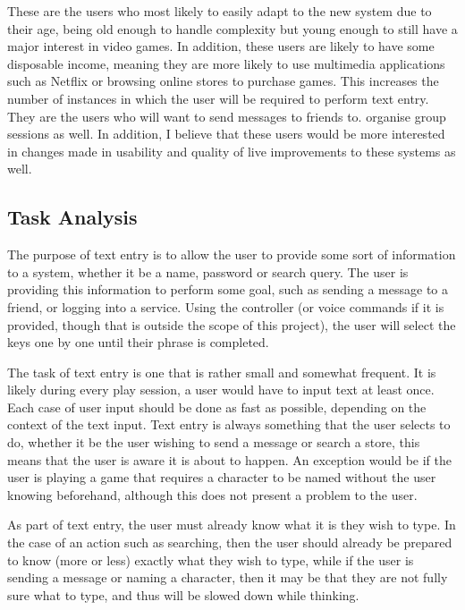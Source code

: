 \documentclass[requirements.tex]{subfiles}
\begin{document}
These are the users who most likely to easily adapt to the new system due to
their age, being old enough to handle complexity but young enough to still have
a major interest in video games. In addition, these users are likely to have
some disposable income, meaning they are more likely to use multimedia
applications such as Netflix or browsing online stores to purchase games. This
increases the number of instances in which the user will be required to perform
text entry. They are the users who will want to send messages to friends to.
organise group sessions as well. In addition, I believe that these users would
be more interested in changes made in usability and quality of live improvements
to these systems as well.

\subsection{Task Analysis} %
\label{sub:task_analysis}
The purpose of text entry is to allow the user to provide some sort of
information to a system, whether it be a name, password or search query. The
user is providing this information to perform some goal, such as sending a
message to a friend, or logging into a service. Using the controller (or voice
commands if it is provided, though that is outside the scope of this project),
the user will select the keys one by one until their phrase is completed.

The task of text entry is one that is rather small and somewhat frequent. It is
likely during every play session, a user would have to input text at least once.
Each case of user input should be done as fast as possible, depending on the
context of the text input. Text entry is always something that the user selects
to do, whether it be the user wishing to send a message or search a store, this
means that the user is aware it is about to happen. An exception would be if the
user is playing a game that requires a character to be named without the user
knowing beforehand, although this does not present a problem to the user.

As part of text entry, the user must already know what it is they wish to type.
In the case of an action such as searching, then the user should already be
prepared to know (more or less) exactly what they wish to type, while if the
user is sending a message or naming a character, then it may be that they are
not fully sure what to type, and thus will be slowed down while thinking. 
\end{document}
